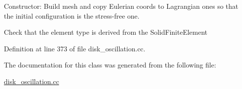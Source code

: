 Constructor\+: Build mesh and copy Eulerian coords to Lagrangian ones so that the initial configuration is the stress-\/free one. 

Check that the element type is derived from the Solid\+Finite\+Element 

Definition at line 373 of file disk\+\_\+oscillation.\+cc.



The documentation for this class was generated from the following file\+:\begin{DoxyCompactItemize}
\item 
\hyperlink{disk__oscillation_8cc}{disk\+\_\+oscillation.\+cc}\end{DoxyCompactItemize}
